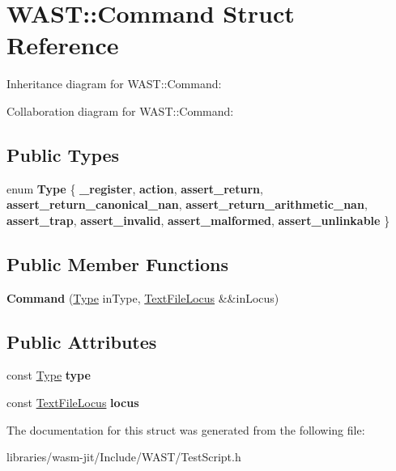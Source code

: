 \hypertarget{struct_w_a_s_t_1_1_command}{}\section{W\+A\+ST\+:\+:Command Struct Reference}
\label{struct_w_a_s_t_1_1_command}


Inheritance diagram for W\+A\+ST\+:\+:Command\+:


Collaboration diagram for W\+A\+ST\+:\+:Command\+:
\subsection*{Public Types}
\begin{DoxyCompactItemize}
\item 
\mbox{\label{struct_w_a_s_t_1_1_command_afd324aa82f13813a050e1d9939b50611}} 
enum {\bfseries Type} \{ \newline
{\bfseries \+\_\+register}, 
{\bfseries action}, 
{\bfseries assert\+\_\+return}, 
{\bfseries assert\+\_\+return\+\_\+canonical\+\_\+nan}, 
\newline
{\bfseries assert\+\_\+return\+\_\+arithmetic\+\_\+nan}, 
{\bfseries assert\+\_\+trap}, 
{\bfseries assert\+\_\+invalid}, 
{\bfseries assert\+\_\+malformed}, 
\newline
{\bfseries assert\+\_\+unlinkable}
 \}
\end{DoxyCompactItemize}
\subsection*{Public Member Functions}
\begin{DoxyCompactItemize}
\item 
\mbox{\label{struct_w_a_s_t_1_1_command_a8411f2eb2349e310829ece56d1acfc30}} 
{\bfseries Command} (\mbox{\hyperlink{struct_type}{Type}} in\+Type, \mbox{\hyperlink{struct_w_a_s_t_1_1_text_file_locus}{Text\+File\+Locus}} \&\&in\+Locus)
\end{DoxyCompactItemize}
\subsection*{Public Attributes}
\begin{DoxyCompactItemize}
\item 
\mbox{\label{struct_w_a_s_t_1_1_command_af3295caa44373840203d77728de4814b}} 
const \mbox{\hyperlink{struct_type}{Type}} {\bfseries type}
\item 
\mbox{\label{struct_w_a_s_t_1_1_command_a6eca05a9daa236b4a1b49c4807bca3f4}} 
const \mbox{\hyperlink{struct_w_a_s_t_1_1_text_file_locus}{Text\+File\+Locus}} {\bfseries locus}
\end{DoxyCompactItemize}


The documentation for this struct was generated from the following file\+:\begin{DoxyCompactItemize}
\item 
libraries/wasm-\/jit/\+Include/\+W\+A\+S\+T/Test\+Script.\+h\end{DoxyCompactItemize}
